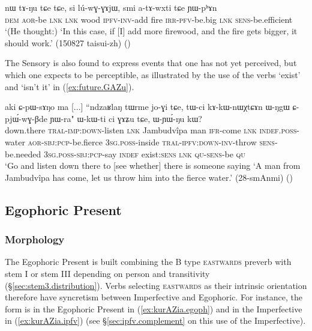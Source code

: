 \begin{exe}
\ex \label{ex:atAwxti.YWphAn}
\gll nɯ tɤ-ŋu tɕe tɕe, si lú-wɣ-ɣɤjɯ, smi a-tɤ-wxti tɕe ɲɯ-pʰɤn \\
\textsc{dem} \textsc{aor}-be \textsc{lnk} \textsc{lnk} wood \textsc{ipfv}-\textsc{inv}-add fire \textsc{irr}-\textsc{pfv}-be.big \textsc{lnk} \textsc{sens}-be.efficient \\
\glt `(He thought:) `In this case, if [I] add more firewood, and the fire gets bigger, it should work.' (150827 taisui-zh)
()
\end{exe}

The Sensory is also found to express events that one has not yet perceived, but which one expects to be perceptible, as illustrated by the use of the verbs  `exist' and  `isn't it' in (\ref{ex:future.GAZu}).

\begin{exe}
\ex \label{ex:future.GAZu}
\gll  aki ɕ-pɯ-sɤŋo ma [...] ``ndzaʁlaŋ tɯrme jo-ɣi tɕe, tɯ-ci kɤ-kɯ-nɯχtɕɤn ɯ-ŋgɯ ɕ-pjɯ́-wɣ-βde ɲɯ-ra" ɯ-kɯ-ti ci ɣɤʑu tɕe, ɯ-ɲɯ́-ŋu kɯ? \\
down.there \textsc{tral}-\textsc{imp}:\textsc{down}-listen \textsc{lnk} { } Jambudvîpa man \textsc{ifr}-come \textsc{lnk} \textsc{indef}.\textsc{poss}-water \textsc{aor}-\textsc{sbj}:\textsc{pcp}-be.fierce \textsc{3sg}.\textsc{poss}-inside \textsc{tral}-\textsc{ipfv}:\textsc{down}-\textsc{inv}-throw \textsc{sens}-be.needed \textsc{3sg}.\textsc{poss}-\textsc{sbj}:\textsc{pcp}-say \textsc{indef} exist:\textsc{sens} \textsc{lnk} \textsc{qu}-\textsc{sens}-be \textsc{qu} \\
\glt `Go and listen down there to [see whether] there is someone saying `A man from Jambudvîpa has come, let us throw him into the fierce water.' (28-smAnmi)
()
\end{exe}

\subsection{Egophoric Present} \label{sec:egophoric}


\subsubsection{Morphology} \label{sec:egophoric.morphology}
The Egophoric Present is built combining the B type \textsc{eastwards}  preverb with stem I or stem III depending on person and transitivity (§\ref{sec:stem3.distribution}). Verbs selecting \textsc{eastwards} as their intrinsic orientation therefore have syncretism between Imperfective and Egophoric. For instance, the form  is in the Egophoric Present in (\ref{ex:kurAZia.egoph}) and in the Imperfective in (\ref{ex:kurAZia.ipfv}) (see §\ref{sec:ipfv.complement} on this use of the Imperfective).

